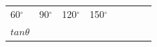 \begin{center}
\begin{xtabular*}{\mytablewidth}[t]{|p{10\mystarwidth}|p{10\mystarwidth}|p{10\mystarwidth}|p{10\mystarwidth}|p{10\mystarwidth}|p{10\mystarwidth}|p{10\mystarwidth}|p{10\mystarwidth}|}
    
        60\begin{math}{}^{\circ }\end{math} &
    
    
        90\begin{math}{}^{\circ }\end{math} &
    
    
        120\begin{math}{}^{\circ }\end{math} &
    
    
        150\begin{math}{}^{\circ }\end{math} &
    
    
     \tabularnewline{}
    
    
        
                  \begin{math}tan\theta \end{math}
                 &
    
    

\end{xtabular*}
\end{center}
